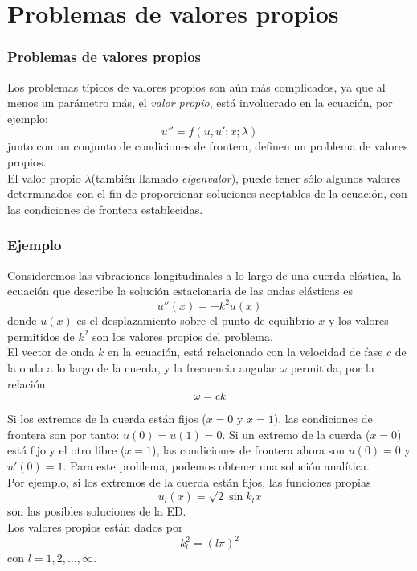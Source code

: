 \section{Problemas de valores propios}
\begin{frame}
\frametitle{Problemas de valores propios}
Los problemas típicos de valores propios son aún más complicados, ya que al menos un parámetro más, el \emph{valor propio}, está involucrado en la ecuación, por ejemplo:
\begin{equation}
u'' = f(u, u'; x; \lambda)
\label{eq:ecuacion_vp}
\end{equation}
junto con un conjunto de condiciones de frontera, definen un problema de valores propios.
\\
\medskip
El valor propio $\lambda$(también llamado \emph{eigenvalor}), puede tener sólo algunos valores determinados  con el fin de proporcionar soluciones aceptables de la ecuación, con las condiciones de frontera establecidas.
\end{frame}
\begin{frame}
\frametitle{Ejemplo}
Consideremos las vibraciones longitudinales a lo largo de una cuerda elástica, la ecuación que describe la solución estacionaria de las ondas elásticas es
\begin{equation}
u''(x) = - k^{2} u(x)
\end{equation}
donde $u(x)$ es el desplazamiento sobre el punto de equilibrio $x$ y los valores permitidos de $k^{2}$ son los valores propios del problema.
\\
\medskip
El vector de onda $k$ en la ecuación, está relacionado con la velocidad de fase $c$ de la onda a lo largo de la cuerda, y la frecuencia angular $\omega$ permitida, por la relación
\begin{equation}
\omega = ck
\end{equation}
\end{frame}
\begin{frame}
Si los extremos de la cuerda están fijos ($x=0$ y $x=1$), las condiciones de frontera son por tanto: $u(0)=u(1)=0$. Si un extremo de la cuerda ($x=0$) está fijo y el otro libre ($x=1$), las condiciones de frontera ahora son $u(0)=0$ y $u'(0)=1$. Para este problema, podemos obtener una solución analítica.
\\
\medskip
Por ejemplo, si los extremos de la cuerda están fijos, las funciones propias
\begin{equation}
u_{l}(x) = \sqrt{2} \sin k_{l} x
\end{equation}
son las posibles soluciones de la ED.
\\
\medskip
\pause
Los valores propios están dados por
\begin{equation}
k_{l}^{2} = (l \pi)^{2}
\end{equation}
con $l=1,2,\ldots,\infty$. 
\end{frame}

